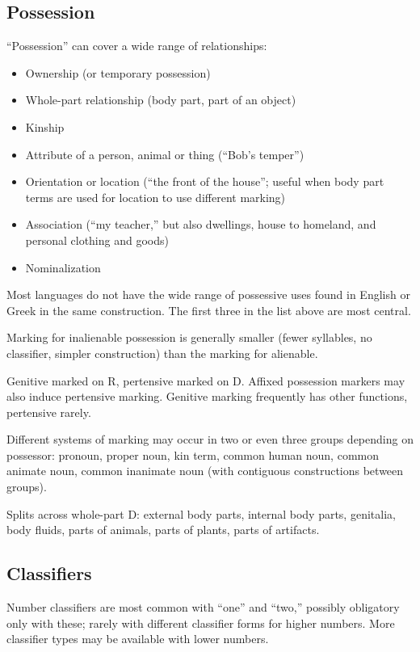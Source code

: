 \documentclass[11pt]{article}
\newenvironment{grammarlist}%
 {\begin{itemize}\addtolength{\itemsep}{-0.5\baselineskip}\ignorespaces}%
 {\end{itemize}\ignorespacesafterend}
\begin{document}
\subsection{Possession}
``Possession'' can cover a wide range of relationships:

\begin{grammarlist}
  \item Ownership (or temporary possession)
  \item Whole-part relationship (body part, part of an object)
  \item Kinship
  \item Attribute of a person, animal or thing (``Bob's temper'')
  \item Orientation or location (``the front of the house''; useful
    when body part terms are used for location to use different
    marking)
  \item Association (``my teacher,'' but also dwellings, house to
    homeland, and personal clothing and goods)
  \item Nominalization
\end{grammarlist}

\noindent Most languages do not have the wide range of possessive uses
found in English or Greek in the same construction.  The first three
in the list above are most central.

Marking for inalienable possession is generally smaller (fewer
syllables, no classifier, simpler construction) than the marking for
alienable.

Genitive marked on R, pertensive marked on D.  Affixed possession
markers may also induce pertensive marking.  Genitive marking
frequently has other functions, pertensive rarely.

Different systems of marking may occur in two or even three groups
depending on possessor: pronoun, proper noun, kin term, common human
noun, common animate noun, common inanimate noun (with contiguous
constructions between groups).

Splits across whole-part D: external body parts, internal body parts,
genitalia, body fluids, parts of animals, parts of plants, parts of
artifacts. 

\subsection{Classifiers}
Number classifiers are most common with ``one'' and ``two,'' possibly
obligatory only with these; rarely with different classifier forms for
higher numbers.  More classifier types may be available with lower
numbers.
\end{document}
